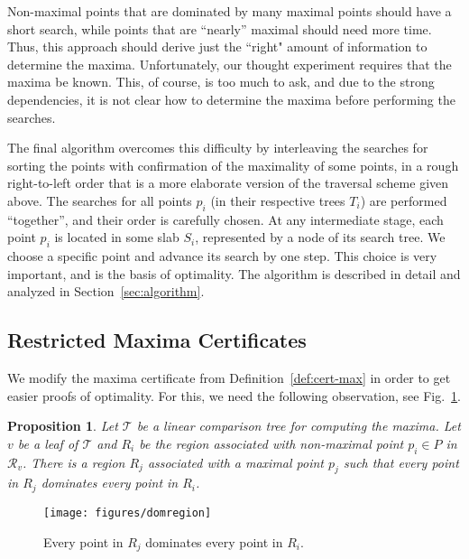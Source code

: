 \documentclass[letterpaper,11pt]{article}
\newtheorem{prop}[theorem]{Proposition}
\newcommand{\cR}{\mathcal{R}}
\newcommand{\cT}{\mathcal{T}}
\begin{document}
Non-maximal points that are dominated 
by many maximal points should 
have a short search, while points
that are ``nearly'' maximal should 
need more time. 
Thus, this approach
should derive just the ``right" amount 
of information to determine the maxima.
Unfortunately, our thought experiment requires 
that the maxima be known.
This, of course, is too much to ask, and 
due to the strong dependencies, it is not clear
how to determine the maxima before performing 
the searches.

The final algorithm overcomes this 
difficulty by interleaving the searches 
for sorting the points with confirmation
of the maximality of some points, in 
a rough right-to-left order
that is a more elaborate version of the traversal scheme given
above. 
The searches for all points $p_i$ (in their 
respective trees $T_i$) are performed 
``together'', and their order is carefully chosen. 
At any intermediate
stage, each point $p_i$ is located in 
some slab $S_i$, represented by
a node of its search tree. We 
choose a specific point and advance
its search by one step. This choice is 
very important, and is the basis
of optimality. The algorithm is 
described in detail and analyzed in 
Section~\ref{sec:algorithm}.

\subsection{Restricted Maxima Certificates}

We modify the maxima certificate 
from Definition~\ref{def:cert-max} in order
to get easier proofs of optimality.
For this, we need the following observation,
see Fig.~\ref{fig:domregion}.

\begin{prop}\label{prop:dom} 
  Let $\cT$ be a linear comparison
  tree for computing the maxima.
  Let $v$ be a leaf of $\cT$ 
  and $R_i$ be the region 
  associated with non-maximal point 
  $p_i \in P$ in $\cR_v$. 
  There is a region $R_j$
  associated with a maximal point $p_j$ 
  such that every point in $R_j$
  dominates every point in $R_i$.
\end{prop}
\begin{figure}
\centering
\texttt{[image: figures/domregion]}
\caption{Every point in $R_j$ dominates every point in $R_i$.}
\label{fig:domregion}
\end{figure}
\end{document}
